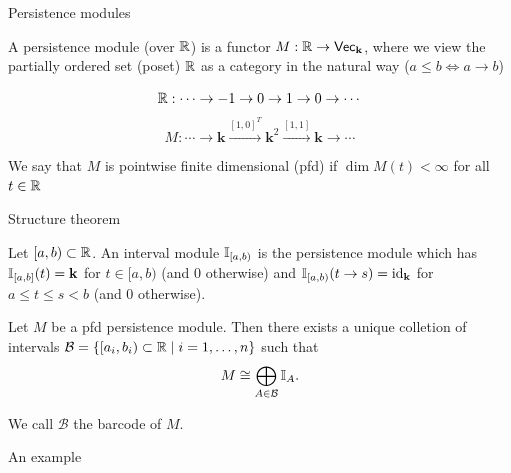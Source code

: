 \documentclass{beamer}
\begin{document}
    \begin{frame}{Persistence modules}
        \begin{definition}
            A \alert{persistence module} (over $\mathbb{R}$) is a functor $M:\mathbb{R}\to\normalfont\mathsf{Vec}_{\textbf{k}}$, where we view the partially ordered set (poset) $\mathbb{R}$ as a category in the natural way ($a\leq b\iff a\to b$)
        \end{definition}\pause

        \begin{example}
            \[ \mathbb{R}:\cdots\to -1\to 0\to 1\to 0\to\cdots \]
            \[ M:\cdots\to\mathbf{k}\xrightarrow{[1,0]^T}\mathbf{k}^2\xrightarrow{[1,1]}\mathbf{k}\to\cdots \]
        \end{example}\pause

        We say that $M$ is \alert{pointwise finite dimensional (pfd)} if $\dim M(t)<\infty$ for all $t\in\mathbb{R}$
    \end{frame}
    
    \begin{frame}{Structure theorem}
        \begin{definition}
            Let $[a,b)\subset\mathbb{R}$. An \alert{interval module} $\mathbb{I}_{[a,b)}$ is the persistence module which has $\mathbb{I}_{[a,b]}(t)=\mathbf{k}$ for $t\in[a,b)$ (and 0 otherwise) and $\mathbb{I}_{[a,b)}(t\to s)=\normalfont\text{id}_{\mathbf{k}}$ for $a\leq t\leq s<b$ (and 0 otherwise).
        \end{definition}\pause
        \begin{theorem}
            Let $M$ be a pfd persistence module. Then there exists a unique colletion of intervals $\mathcal{B}=\{[a_i, b_i)\subset\mathbb{R}\mid i=1,\dots, n\}$ such that
            \[M\cong\bigoplus_{A\in\mathcal{B}}\mathbb{I}_{A}.\]
        \end{theorem}
        \cite{BotnanCrawley_2018}\pause
        
        We call $\mathcal{B}$ the \alert{barcode} of $M$.
    \end{frame}

    \begin{frame}{An example}
        \begin{figure}
            \centering
        \end{figure}              
    \end{frame}
\end{document}
